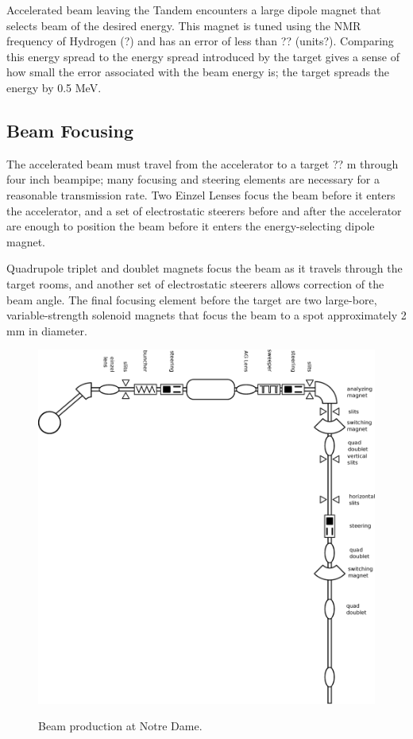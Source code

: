 Accelerated beam leaving the Tandem encounters a large dipole magnet that selects beam of the desired energy.  This magnet is tuned using the NMR frequency of Hydrogen (?) and has an error of less than ?? (units?).  Comparing this energy spread to the energy spread introduced by the target gives a sense of how small the error associated with the beam energy is; the target spreads the energy by 0.5 MeV.

\subsection{Beam Focusing}

The accelerated beam must travel from the accelerator to a target ?? m through four inch beampipe; many focusing and steering elements are necessary for a reasonable transmission rate.  Two Einzel Lenses focus the beam before it enters the accelerator, and a set of electrostatic steerers before and after the accelerator are enough to position the beam before it enters the energy-selecting dipole magnet.

Quadrupole triplet and doublet magnets focus the beam as it travels through the target rooms, and another set of electrostatic steerers allows correction of the beam angle.  The final focusing element before the target are two large-bore, variable-strength solenoid magnets that focus the beam to a spot approximately 2 mm in diameter.

\begin{figure}[ht]
\centering
\includegraphics[width=1.0\textwidth]{figures/NSL_beamline.eps}
\label{fig:beamline}
\caption{Beam production at Notre Dame.}
\end{figure}

